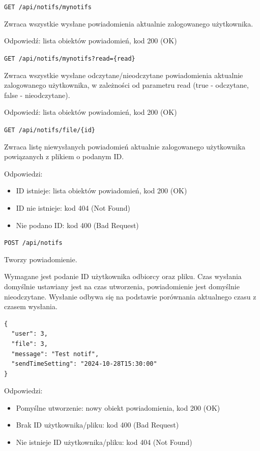 \documentclass[a4paper,twoside,12pt]{book}
\begin{document}
\texttt{GET\ /api/notifs/mynotifs}

Zwraca wszystkie wysłane powiadomienia aktualnie zalogowanego użytkownika.

Odpowiedź: lista obiektów powiadomień, kod 200 (OK)

\label{get-all-my-readunread-notifications}

\texttt{GET\ /api/notifs/mynotifs?read=\{read\}}

Zwraca wszystkie wysłane odczytane/nieodczytane powiadomienia aktualnie zalogowanego użytkownika, w zależności od parametru read (true - odczytane, false - nieodczytane).

Odpowiedź: lista obiektów powiadomień, kod 200 (OK)

\label{get-current-users-notification-by-file-id}

\texttt{GET\ /api/notifs/file/\{id\}}

Zwraca listę niewysłanych powiadomień aktualnie zalogowanego użytkownika powiązanych z plikiem o podanym ID.

Odpowiedzi: 
\begin{itemize}
	\item ID istnieje: lista obiektów powiadomień, kod 200 (OK) 
	\item ID nie istnieje: kod 404 (Not Found) 
	\item Nie podano ID: kod 400 (Bad Request)
\end{itemize}

\label{create-notification}

\texttt{POST\ /api/notifs}

Tworzy powiadomienie.

Wymagane jest podanie ID użytkownika odbiorcy oraz pliku. Czas wysłania domyślnie ustawiany jest na czas utworzenia, powiadomienie jest domyślnie nieodczytane. Wysłanie odbywa się na podstawie porównania aktualnego czasu z czasem wysłania.

\begin{verbatim}
{
  "user": 3,
  "file": 3,
  "message": "Test notif",
  "sendTimeSetting": "2024-10-28T15:30:00"
}
\end{verbatim}

Odpowiedzi: 
\begin{itemize}
	\item Pomyślne utworzenie: nowy obiekt powiadomienia, kod 200 (OK) 
	\item Brak ID użytkownika/pliku: kod 400 (Bad Request) 
	\item Nie istnieje ID użytkownika/pliku: kod 404 (Not Found)
\end{itemize}
\end{document}
